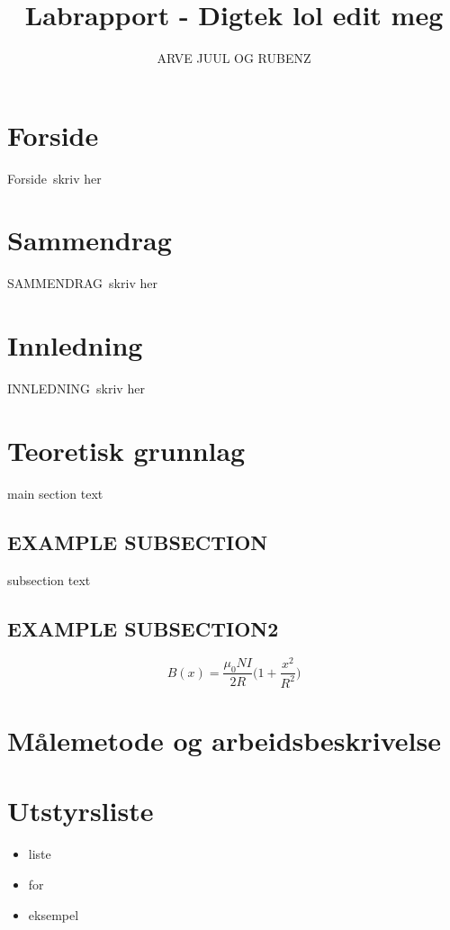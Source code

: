 \documentclass[12pt,norsk,a4paper]{article}
\begin{document}
\title{Labrapport - Digtek lol edit meg}
\author {ARVE JUUL OG RUBENZ}

\maketitle

\clearpage



\section*{Forside}
Forside\
skriv her
\clearpage
\setcounter{page}{1}

\section*{Sammendrag}
SAMMENDRAG\
skriv her
\clearpage

\tableofcontents
\clearpage

\section{Innledning}
INNLEDNING\
skriv her
\clearpage

\section{Teoretisk grunnlag}
main section text
    \subsection{EXAMPLE SUBSECTION}
    subsection text
    \subsection{EXAMPLE SUBSECTION2}

        \begin{equation}
            \label{eq:magnetfelt-spole}
            B(x) = \frac{\mu_0 N I}{2R} \Bigg(1 + \frac{x^2}{R^2} \Bigg) 
        \end{equation}
\clearpage

\section{Målemetode og arbeidsbeskrivelse}
\clearpage


\section{Utstyrsliste}
    \begin{itemize}
    \item liste
    \item for
    \item eksempel
    \end{itemize}
\clearpage
\end{document}
